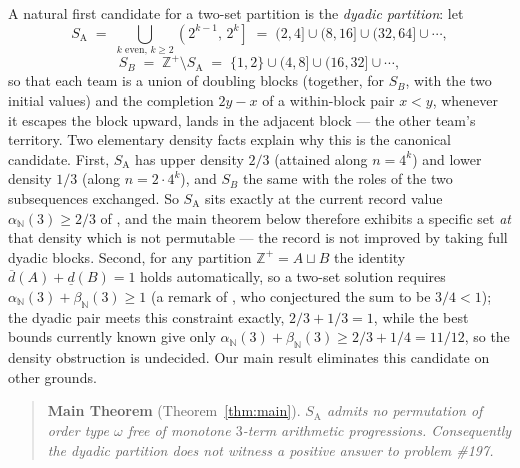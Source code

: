 \documentclass[11pt]{article}
\theoremstyle{definition}
\newcommand{\Z}{\mathbb{Z}}
\newcommand{\N}{\mathbb{N}}
\newcommand{\SA}{S_{\mathrm{A}}}
\begin{document}
A natural first candidate for a two-set partition is the \emph{dyadic
partition}: let
\[
\SA \;=\; \bigcup_{k \text{ even},\, k \ge 2} \left(2^{k-1},\, 2^{k}\right]
\;=\; (2,4] \cup (8,16] \cup (32,64] \cup \cdots,
\]
\[
S_B \;=\; \Z^+ \setminus \SA \;=\; \{1,2\} \cup (4,8] \cup (16,32] \cup \cdots,
\]
so that each team is a union of doubling blocks (together, for $S_B$, with
the two initial values) and the completion
$2y - x$ of a within-block pair $x < y$, whenever it escapes the block
upward, lands in the adjacent block --- the other team's territory. Two
elementary density facts explain why this is the canonical candidate. First,
$\SA$ has upper density $2/3$ (attained along $n = 4^k$) and lower density
$1/3$ (along $n = 2\cdot 4^k$), and $S_B$ the same with the roles of the two
subsequences exchanged. So $\SA$ sits exactly at the current record value
$\alpha_{\N}(3) \ge 2/3$ of \cite{Gen26}, and the main theorem below
therefore exhibits a specific set \emph{at} that density which is not
permutable --- the record is not improved by taking full dyadic blocks.
Second, for any partition $\Z^+ = A \sqcup B$ the identity
$\overline{d}(A) + \underline{d}(B) = 1$ holds automatically, so a two-set
solution requires $\alpha_{\N}(3) + \beta_{\N}(3) \ge 1$ (a remark of
\cite{LV11}, who conjectured the sum to be $3/4 < 1$); the dyadic pair meets
this constraint exactly, $2/3 + 1/3 = 1$, while the best bounds currently
known give only $\alpha_{\N}(3) + \beta_{\N}(3) \ge 2/3 + 1/4 = 11/12$, so
the density obstruction is undecided. Our main result eliminates this
candidate on other grounds.

\begin{quote}
\textbf{Main Theorem} (Theorem~\ref{thm:main}). \emph{$\SA$ admits no
permutation of order type $\omega$ free of monotone $3$-term arithmetic
progressions. Consequently the dyadic partition does not witness a positive
answer to problem \#197.}
\end{quote}
\end{document}
